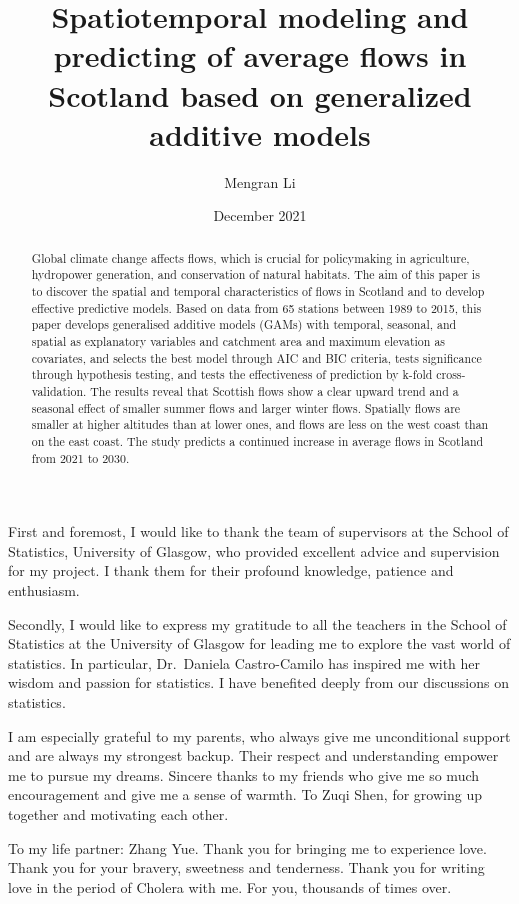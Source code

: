 \documentclass[12pt,oneside]{reedthesis}
\title{Spatiotemporal modeling and predicting of average flows in Scotland based on generalized additive models}
\author{Mengran Li}
\date{December 2021}
\begin{document}
  \maketitle

\frontmatter %
\pagestyle{empty} %
  \begin{acknowledgements}
    First and foremost, I would like to thank the team of supervisors at the School of Statistics, University of Glasgow, who provided excellent advice and supervision for my project. I thank them for their profound knowledge, patience and enthusiasm.

    Secondly, I would like to express my gratitude to all the teachers in the School of Statistics at the University of Glasgow for leading me to explore the vast world of statistics. In particular, Dr.~Daniela Castro-Camilo has inspired me with her wisdom and passion for statistics. I have benefited deeply from our discussions on statistics.

    I am especially grateful to my parents, who always give me unconditional support and are always my strongest backup. Their respect and understanding empower me to pursue my dreams. Sincere thanks to my friends who give me so much encouragement and give me a sense of warmth. To Zuqi Shen, for growing up together and motivating each other.

    To my life partner: Zhang Yue. Thank you for bringing me to experience love. Thank you for your bravery, sweetness and tenderness. Thank you for writing love in the period of Cholera with me. For you, thousands of times over.
  \end{acknowledgements}

  \hypersetup{linkcolor=black}
  \setcounter{secnumdepth}{2}
  \setcounter{tocdepth}{2}
  \tableofcontents

  \listoftables

  \listoffigures
  \begin{abstract}
    Global climate change affects flows, which is crucial for policymaking in agriculture, hydropower generation, and conservation of natural habitats. The aim of this paper is to discover the spatial and temporal characteristics of flows in Scotland and to develop effective predictive models. Based on data from 65 stations between 1989 to 2015, this paper develops generalised additive models (GAMs) with temporal, seasonal, and spatial as explanatory variables and catchment area and maximum elevation as covariates, and selects the best model through AIC and BIC criteria, tests significance through hypothesis testing, and tests the effectiveness of prediction by k-fold cross-validation. The results reveal that Scottish flows show a clear upward trend and a seasonal effect of smaller summer flows and larger winter flows. Spatially flows are smaller at higher altitudes than at lower ones, and flows are less on the west coast than on the east coast. The study predicts a continued increase in average flows in Scotland from 2021 to 2030.
  \end{abstract}
\end{document}
